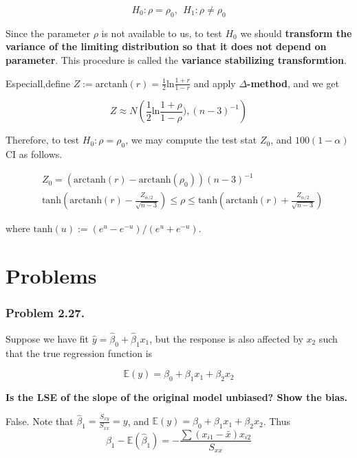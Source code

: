 \documentclass[12pt]{article}
\begin{document}
$$
H_0 : \rho = \rho_0, \ \ H_1 : \rho \neq \rho_0
$$

Since the parameter $\rho$ is not available to us, to test $H_0$ we should \textbf{transform the variance of the limiting distribution so that it does not depend on parameter}. This procedure is called the \textbf{variance stabilizing transformtion}. 

Especiall,define $Z := \mathrm{arctanh}(r) = \frac{1}{2} \mathrm{ln} \frac{1+r}{1-r} $ and apply \textbf{$\Delta$-method}, and we get 

$$
Z \approx N\left(\frac{1}{2} \mathrm{ln} \frac{1+\rho}{1-\rho}), (n-3)^{-1} \right)
$$

Therefore, to test $H_0 : \rho = \rho_0$, we may compute the test stat $Z_0$, and $100(1-\alpha)$ CI as follows.

$$
\begin{aligned}
&Z_0 = (\mathrm{arctanh}(r) - \mathrm{arctanh}(\rho_0))(n-3)^{-1} \\[10pt]
&\mathrm{tanh} \left( \mathrm{arctanh}(r) - \frac{Z_{\alpha/2}}{\sqrt{n-3}} \right) \le \rho \le \mathrm{tanh} \left( \mathrm{arctanh}(r) + \frac{Z_{\alpha/2}}{\sqrt{n-3}} \right)
\end{aligned}
$$

where $\mathrm{tanh}(u) := (e^u - e^{-u})/(e^u + e^{-u})$.


\pagebreak

\section*{Problems}

\subsubsection*{Problem 2.27.} Suppose we have fit $\hat{y} = \hat{\beta}_0 + \hat{\beta}_1 x_1$, but the response is also affected by $x_2$ such that the true regression function is 

$$
\mathbb{E}(y) = \beta_0 + \beta_1 x_1 + \beta_2 x_2
$$

\textbf{Is the LSE of the slope of the original model \textbf{unbiased}? Show the bias.}

\bigskip

False. Note that $\hat{\beta}_1 = \frac{S_{xy}}{S_{xx}} = y$, and $\mathbb{E}(y) = \beta_0 + \beta_1 x_1 + \beta_2 x_2$. Thus $$\beta_1 - \mathbb{E} (\hat{\beta}_1 ) = - \frac{\sum (x_{i1} - \bar{x})x_{i2}}{S_{xx}}$$
\end{document}
